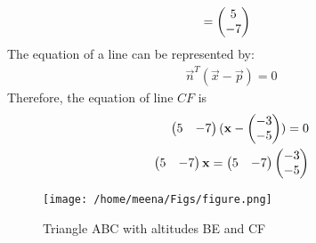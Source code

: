 \documentclass[12pt]{article}
\begin{document}
\begin{enumerate}
\begin{align}
&= \begin{pmatrix}5 \\ -7\end{pmatrix}
\end{align}
The equation of a line can be represented by:
\begin{align}
\vec{n}^{T}(\vec{x}-\vec{p})=0
\end{align}
Therefore, the equation of line $CF$ is 
\begin{align}
\begin{pmatrix}5&-7\end{pmatrix}(\mathbf{x}-\begin{pmatrix}-3\\-5\\\end{pmatrix})=0\\
\begin{pmatrix}5&-7\end{pmatrix}\mathbf{x}=\begin{pmatrix}5&-7\end{pmatrix}\begin{pmatrix}-3\\-5\\\end{pmatrix}\\
\end{align}
\end{enumerate}
\begin{figure} [htbp]
\texttt{[image: /home/meena/Figs/figure.png]}
\caption{Triangle ABC with altitudes BE and CF}
\label{fig}
\end{figure}
\end{document}
